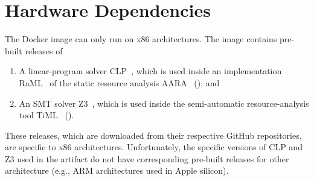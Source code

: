 
\section{Hardware Dependencies}

The Docker image can only run on x86 architectures.
%
The image contains pre-built releases of
\begin{enumerate}
  \item A linear-program solver CLP~\citep{CLP}, which is used inside an
        implementation RaML~\citep{RaML,Hoffmann2017} of the static resource
        analysis AARA~\citep{Hofmann2003,Hoffmann2011a,Hoffmann2022}
        ();
        and
  \item An SMT solver Z3~\citep{DeMoura2008}, which is used inside the
        semi-automatic resource-analysis tool TiML~\citep{WangWC17}
        ().
\end{enumerate}
%
These releases, which are downloaded from their respective GitHub repositories,
are specific to x86 architectures.
%
Unfortunately, the specific versions of CLP and Z3 used in the artifact do not
have corresponding pre-built releases for other architecture (e.g., ARM
architectures used in Apple silicon).
